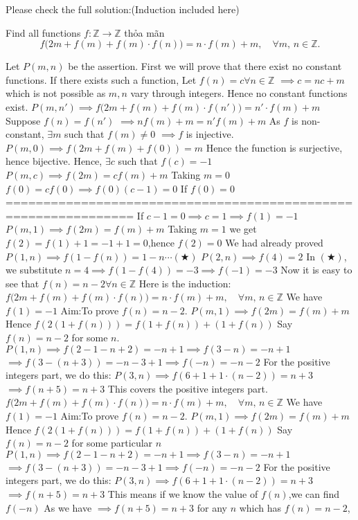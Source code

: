 \begin{solution}
	Please check the full solution:(Induction included here)
\begin{tcolorbox}[quote="CanVQ"]Find all functions $f:\mathbb Z \to \mathbb Z$ thỏa mãn \[f\big(2m+f(m)+f(m)\cdot f(n)\big)=n\cdot f(m)+m,\quad\forall m,\,n \in \mathbb Z.\]\end{tcolorbox}
Let $P(m,n)$ be the assertion.
First we will prove that there exist no constant functions.
If there exists such a function,
Let $f(n)=c\forall n\in \mathbb{Z}$
$\implies c=nc+m$ which is not possible as $m,n$ vary through integers.
Hence no constant functions exist.
$P(m,n')\implies f\big(2m+f(m)+f(m)\cdot f(n')\big)=n'\cdot f(m)+m$
Suppose $f(n)=f(n')$
$\implies nf(m)+m=n'f(m)+m$
As $f$ is non-constant, $\exists m$ such that $f(m)\neq 0$
$\implies f$ is injective.
$P(m,0)\implies f(2m+f(m)+f(0))=m$
Hence the function is surjective, hence bijective.
Hence, $\exists c$ such that $f(c)=-1$
$P(m,c)\implies f(2m)=cf(m)+m$
Taking $m=0$
$f(0)=cf(0)\implies f(0)(c-1)=0$
If $f(0)=0$
===============================================================
If $c-1=0\implies c=1\implies f(1)=-1$
$P(m,1)\implies f(2m)=f(m)+m$
Taking $m=1$ we get $f(2)=f(1)+1=-1+1=0$,hence $f(2)=0$
We had already proved
$P(1,n)\implies f(1-f(n))=1-n\cdots(\bigstar)$
$P(2,n)\implies f(4)=2$
In $(\bigstar)$, we substitute $n=4\implies f(1-f(4))=-3\implies f(-1)=-3$
Now it is easy to see that $f(n)=n-2\forall n\in\mathbb{Z}$
Here is the induction:
$f\big(2m+f(m)+f(m)\cdot f(n)\big)=n\cdot f(m)+m,\quad\forall m,\,n\in\mathbb{Z}$
We have $f(1)=-1$
Aim:To prove $f(n)=n-2$.
$P(m,1)\implies f(2m)=f(m)+m$
Hence $f(2(1+f(n)))=f(1+f(n))+(1+f(n))$
Say $f(n)=n-2$ for some $n$.
$P(1,n)\implies f(2-1-n+2)=-n+1\implies f(3-n)=-n+1$
$\implies f(3-(n+3))=-n-3+1\implies f(-n)=-n-2$
For the positive integers part, we do this:
$P(3,n)\implies f(6+1+1\cdot (n-2))=n+3$
$\implies f(n+5)=n+3$
This covers the positive integers part.$f\big(2m+f(m)+f(m)\cdot f(n)\big)=n\cdot f(m)+m,\quad\forall m,\,n\in\mathbb{Z}$
We have $f(1)=-1$
Aim:To prove $f(n)=n-2$.
$P(m,1)\implies f(2m)=f(m)+m$
Hence $f(2(1+f(n)))=f(1+f(n))+(1+f(n))$
Say $f(n)=n-2$ for some particular $n$
$P(1,n)\implies f(2-1-n+2)=-n+1\implies f(3-n)=-n+1$
$\implies f(3-(n+3))=-n-3+1\implies f(-n)=-n-2$
For the positive integers part, we do this:
$P(3,n)\implies f(6+1+1\cdot (n-2))=n+3$
$\implies f(n+5)=n+3$
This means if we know the value of $f(n)$,we can find $f(-n)$
As we have $\implies f(n+5)=n+3$
for any $n$ which has $f(n)=n-2$,

\end{solution}
